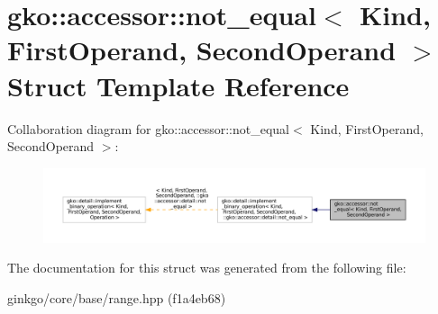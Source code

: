 \hypertarget{structgko_1_1accessor_1_1not__equal}{}\section{gko\+:\+:accessor\+:\+:not\+\_\+equal$<$ Kind, First\+Operand, Second\+Operand $>$ Struct Template Reference}
\label{structgko_1_1accessor_1_1not__equal}


Collaboration diagram for gko\+:\+:accessor\+:\+:not\+\_\+equal$<$ Kind, First\+Operand, Second\+Operand $>$\+:
\nopagebreak
\begin{figure}[H]
\begin{center}
\leavevmode
\includegraphics[width=350pt]{structgko_1_1accessor_1_1not__equal__coll__graph}
\end{center}
\end{figure}


The documentation for this struct was generated from the following file\+:\begin{DoxyCompactItemize}
\item 
ginkgo/core/base/range.\+hpp (f1a4eb68)\end{DoxyCompactItemize}
